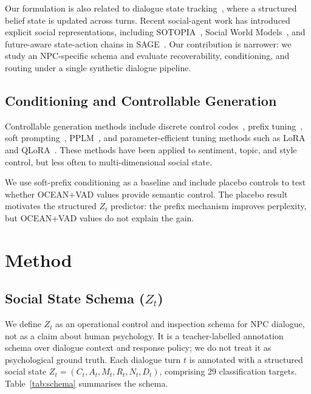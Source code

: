 \documentclass[11pt]{article}
\begin{document}
Our formulation is also related to dialogue state tracking~\cite{mrksic2017neural,feng2023dialogue,jacqmin2024dialoguestate}, where a structured belief state is updated across turns.
Recent social-agent work has introduced explicit social representations, including SOTOPIA~\cite{zhou2024sotopia}, Social World Models~\cite{zhou2025social}, and future-aware state-action chains in SAGE~\cite{sage2025steering}.
Our contribution is narrower: we study an NPC-specific schema and evaluate recoverability, conditioning, and routing under a single synthetic dialogue pipeline.

\subsection{Conditioning and Controllable Generation}

Controllable generation methods include discrete control codes~\cite{keskar2019ctrl}, prefix tuning~\cite{li2021prefix}, soft prompting~\cite{lester2021power}, PPLM~\cite{dathathri2020plug}, and parameter-efficient tuning methods such as LoRA~\cite{hu2021lora} and QLoRA~\cite{dettmers2023qlora}.
These methods have been applied to sentiment, topic, and style control, but less often to multi-dimensional social state.

We use soft-prefix conditioning as a baseline and include placebo controls to test whether OCEAN+VAD values provide semantic control.
The placebo result motivates the structured $Z_t$ predictor: the prefix mechanism improves perplexity, but OCEAN+VAD values do not explain the gain.

\section{Method}
\label{sec:method}

\subsection{Social State Schema ($Z_t$)}
\label{sec:schema}

We define $Z_t$ as an operational control and inspection schema for NPC dialogue, not as a claim about human psychology. It is a teacher-labelled annotation schema over dialogue context and response policy; we do not treat it as psychological ground truth. Each dialogue turn $t$ is annotated with a structured social state $Z_t = (C_t, A_t, M_t, R_t, N_t, D_t)$, comprising 29 classification targets.
Table~\ref{tab:schema} summarises the schema.
\end{document}
